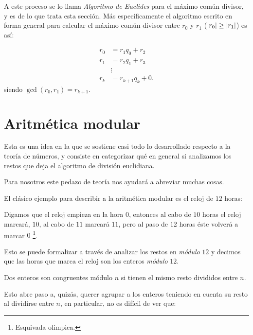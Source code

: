 A este proceso se lo llama \textit{Algoritmo de Euclides}
para el máximo común divisor, y es de lo que trata
esta sección. Más específicamente el algoritmo escrito
en forma general para calcular el máximo
común divisor entre $r_0$ y $r_1$ ($\left\lvert r_0 \right\rvert \geq \left\lvert r_1 \right\rvert$) es así:

\begin{minipage}{\textwidth}
	\begin{align*}
		r_0 & =      r_1q_0 + r_2      \\
		r_1 & =      r_2q_1 + r_3      \\
		    & \vdots                   \\
		r_k & =      r_{k + 1}q_k + 0.
	\end{align*}
	siendo $\gcd(r_0, r_1) = r_{k + 1}$.
\end{minipage}

\chapter{Aritmética modular}
Esta es una idea en la que se sostiene
casi todo lo desarrollado respecto
a la teoría de números, y consiste en
categorizar qué en general
si analizamos los restos que deja
el algoritmo de división euclidiana.

Para nosotros este pedazo de teoría
nos ayudará a abreviar muchas cosas.

El clásico ejemplo para describir a la
aritmética modular es el reloj de $12$ horas:


Digamos que el reloj empieza en la hora $0$,
entonces al cabo de $10$ horas el reloj
marcará, $10$, al cabo de $11$ marcará $11$,
pero al paso de $12$ horas éste volverá a marcar $0$
\footnote{Esquivada olímpica.}. %

Esto se puede formalizar a través de
analizar los restos en \textit{módulo} $12$
y decimos que las horas que marca el reloj
son los enteros \textit{módulo} $12$.

\begin{definition}
	Dos enteros son congruentes módulo $n$
	si tienen el mismo resto divididos entre $n$.
\end{definition}

Esto abre paso a, quizás, querer agrupar
a los enteros teniendo en cuenta
su resto al dividirse entre $n$,
en particular, no es difícil de ver que:

